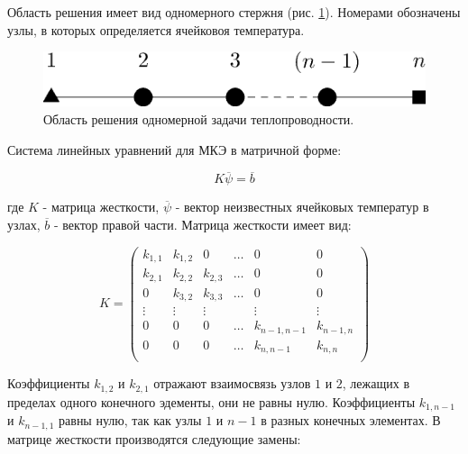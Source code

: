 Область решения имеет вид одномерного стержня (рис. \ref{images:1d}). Номерами обозначены узлы, в которых определяется ячейковоя температура.

\begin{figure} [ht] 
    \center
    \includegraphics [scale=0.8] {images/1d}
    \caption{Область решения одномерной задачи теплопроводности.} 
    \label{images:1d}  
\end{figure}

Система линейных уравнений для МКЭ в матричной форме:

\begin{equation}
    K \overline{\psi} = \overline{b}
    \label{equ:slau}  
\end{equation}

где $K$ - матрица жесткости, $ \overline{\psi}$ - вектор неизвестных ячейковых температур в узлах, $ \overline{b}$ - вектор правой части.
Матрица жесткости имеет вид:

\begin{equation}
    K =
    \left(
        \begin{array}{cccccc}
            k_{1,1} & k_{1,2} & 0       & \ldots & 0           & 0         \\
            k_{2,1} & k_{2,2} & k_{2,3} & \ldots & 0           & 0         \\
            0       & k_{3,2} & k_{3,3} & \ldots & 0           & 0         \\
            \vdots  & \vdots  & \vdots  &        & \vdots      & \vdots    \\
            0       & 0       & 0       & \ldots & k_{n-1,n-1} & k_{n-1,n} \\
            0       & 0       & 0       & \ldots & k_{n,n-1}   & k_{n,n}   \\
        \end{array}
    \right)
    \label{equ:k1}  
\end{equation}

Коэффициенты $k_{1,2}$ и $k_{2,1}$ отражают взаимосвязь узлов $1$ и $2$, лежащих в пределах одного конечного эдементы, они не равны нулю. 
Коэффициенты $k_{1,n-1}$ и $k_{n-1,1}$ равны нулю, так как узлы $1$ и $n-1$ в разных конечных элементах. 
В матрице жесткости производятся следующие замены:

